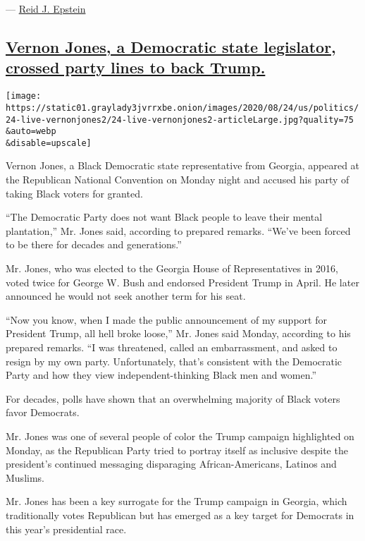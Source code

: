 --- \href{https://www.nytimes3xbfgragh.onion/by/reid-j-epstein}{Reid J.
Epstein}

\hypertarget{vernon-jones-a-democratic-state-legislator-crossed-party-lines-to-back-trump}{%
\subsection{\texorpdfstring{\protect\hyperlink{vernon-jones-a-democratic-state-legislator-crossed-party-lines-to-back-trump}{Vernon
Jones, a Democratic state legislator, crossed party lines to back
Trump.}}{Vernon Jones, a Democratic state legislator, crossed party lines to back Trump.}}\label{vernon-jones-a-democratic-state-legislator-crossed-party-lines-to-back-trump}}

\texttt{[image: https://static01.graylady3jvrrxbe.onion/images/2020/08/24/us/politics/24-live-vernonjones2/24-live-vernonjones2-articleLarge.jpg?quality=75\\\&auto=webp\\\&disable=upscale]}

Vernon Jones, a Black Democratic state representative from Georgia,
appeared at the Republican National Convention on Monday night and
accused his party of taking Black voters for granted.

``The Democratic Party does not want Black people to leave their mental
plantation,'' Mr. Jones said, according to prepared remarks. ``We've
been forced to be there for decades and generations.''

Mr. Jones, who was elected to the Georgia House of Representatives in
2016, voted twice for George W. Bush and endorsed President Trump in
April. He later announced he would not seek another term for his seat.

``Now you know, when I made the public announcement of my support for
President Trump, all hell broke loose,'' Mr. Jones said Monday,
according to his prepared remarks. ``I was threatened, called an
embarrassment, and asked to resign by my own party. Unfortunately,
that's consistent with the Democratic Party and how they view
independent-thinking Black men and women.''

For decades, polls have shown that an overwhelming majority of Black
voters favor Democrats.

Mr. Jones was one of several people of color the Trump campaign
highlighted on Monday, as the Republican Party tried to portray itself
as inclusive despite the president's continued messaging disparaging
African-Americans, Latinos and Muslims.

Mr. Jones has been a key surrogate for the Trump campaign in Georgia,
which traditionally votes Republican but has emerged as a key target for
Democrats in this year's presidential race.

